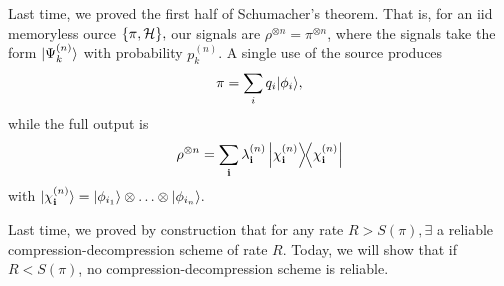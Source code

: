 Last time, we proved the first half of Schumacher's theorem. That is, for an iid memoryless ource $\{\pi,\mathcal H\},$ our signals are $\rho^{\otimes n}=\pi^{\otimes n}$, where the signals take the form $\lvert\Psi_k^{(n)}\rangle$ with probability $p_k^{(n)}$. A single use of the source produces
\begin{equation}
    \pi=\sum_i q_i \lvert\phi_i\rangle,
\end{equation}
while the full output is
\begin{equation}
    \rho^{\otimes n}=\sum_{\boldsymbol{\mathbf{i}}} \lambda_{\boldsymbol{\mathbf{i}}}^{(n)} \left\lvert{\chi_{\boldsymbol{\mathbf{i}}}^{(n)}}\middle\rangle\!\middle\langle{\chi_{\boldsymbol{\mathbf{i}}}^{(n)}}\right\rvert
\end{equation}
with $\lvert\chi_{\boldsymbol{\mathbf{i}}}^{(n)}\rangle=\lvert\phi_{i_1}\rangle\otimes \ldots \otimes \lvert\phi_{i_n}\rangle.$

Last time, we proved by construction that for any rate $R>S(\pi), \exists$ a reliable compression-decompression scheme of rate $R$. Today, we will show that if $R<S(\pi)$, no compression-decompression scheme is reliable.
